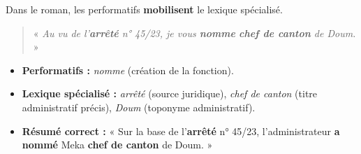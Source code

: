 \documentclass[11pt]{article}
\begin{document}
\begin{exemplebox}
Dans le roman, les performatifs \textbf{mobilisent} le lexique spécialisé.
\begin{quote}
« \emph{Au vu de l'\textbf{arrêté} n° 45/23, je vous \textbf{nomme} \textbf{chef de canton} de Doum. } »
\end{quote}
\begin{itemize}
    \item \textbf{Performatifs :} \emph{nomme} (création de la fonction).
    \item \textbf{Lexique spécialisé :} \emph{arrêté} (source juridique), \emph{chef de canton} (titre administratif précis), \emph{Doum} (toponyme administratif).
    \item \textbf{Résumé correct :} « Sur la base de l'\textbf{arrêté} n° 45/23, l'administrateur \textbf{a nommé} Meka \textbf{chef de canton} de Doum. »
\end{itemize}
\end{exemplebox}
\end{document}
